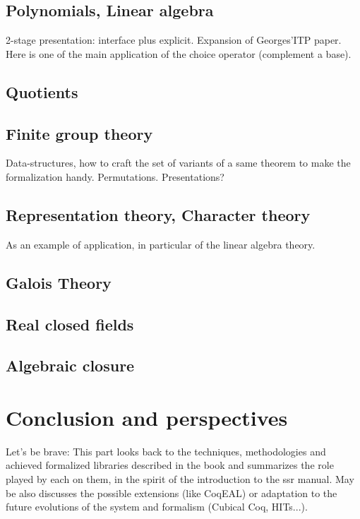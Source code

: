 \documentclass{book}
\begin{document}
\chapter{Polynomials, Linear algebra}

2-stage presentation: interface plus explicit. Expansion of
Georges'ITP paper. Here is one of the main application of the choice
operator (complement a base).

\chapter{Quotients}

\chapter{Finite group theory}

Data-structures, how to craft the set of variants of a same theorem to
make the formalization handy. Permutations. Presentations?

\chapter{Representation theory, Character theory}

As an example of application, in particular of the linear algebra
theory.

\chapter{Galois Theory}


\chapter{Real closed fields}

\chapter{Algebraic closure}

\part{Conclusion and perspectives}

Let's be brave:
This part looks back to the techniques, methodologies and achieved
formalized libraries described in the book and summarizes the role
played by each on them, in the spirit of the introduction to the ssr manual.
May be also discusses the possible extensions
(like CoqEAL) or adaptation to the future evolutions of the system and
formalism (Cubical Coq, HITs...).
\end{document}

